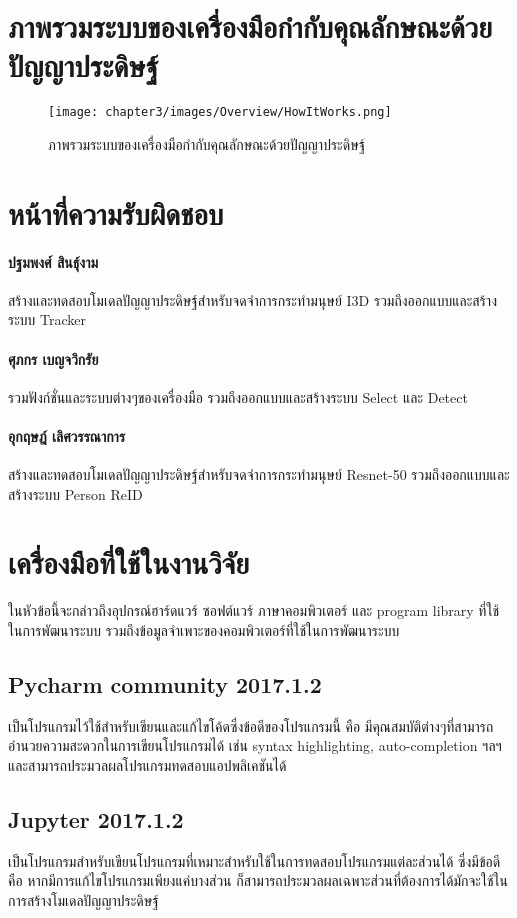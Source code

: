 \section{ภาพรวมระบบของเครื่องมือกำกับคุณลักษณะด้วยปัญญาประดิษฐ์}
\begin{figure}[!ht]
    \centering
    \texttt{[image: chapter3/images/Overview/HowItWorks.png]}
    \caption{ภาพรวมระบบของเครื่องมือกำกับคุณลักษณะด้วยปัญญาประดิษฐ์}
    \label{fig:labeling_overview}
\end{figure}
\clearpage

\section{หน้าที่ความรับผิดชอบ} 
\paragraph*{ปฐมพงศ์ สินธุ์งาม}
สร้างและทดสอบโมเดลปัญญาประดิษฐ์สำหรับจดจำการกระทำมนุษย์ I3D รวมถึงออกแบบและสร้างระบบ Tracker
\paragraph*{ศุภกร เบญจวิกรัย}
รวมฟังก์ชั่นและระบบต่างๆของเครื่องมือ รวมถึงออกแบบและสร้างระบบ Select และ Detect
\paragraph*{อุกฤษฎ์ เลิศวรรณาการ}
สร้างและทดสอบโมเดลปัญญาประดิษฐ์สำหรับจดจำการกระทำมนุษย์ Resnet-50 รวมถึงออกแบบและสร้างระบบ Person ReID 

\vspace{6mm}
\section{เครื่องมือที่ใช้ในงานวิจัย}
ในหัวข้อนี้จะกล่าวถึงอุปกรณ์ฮาร์ดแวร์ ซอฟต์แวร์ ภาษาคอมพิวเตอร์ และ program library ที่ใช้ในการพัฒนาระบบ รวมถึงข้อมูลจำเพาะของคอมพิวเตอร์ที่ใช้ในการพัฒนาระบบ
\subsection*{Pycharm community 2017.1.2} 
เป็นโปรแกรมไว้ใช้สำหรับเขียนและแก้ไขโค้ดซึ่งข้อดีของโปรแกรมนี้ คือ มีคุณสมบัติต่างๆที่สามารถอำนวยความสะดวกในการเขียนโปรแกรมได้ เช่น 
syntax highlighting, auto-completion ฯลฯ และสามารถประมวลผลโปรแกรมทดสอบแอปพลิเคชันได้

\subsection*{Jupyter 2017.1.2} เป็นโปรแกรมสำหรับเขียนโปรแกรมที่เหมาะสำหรับใช้ในการทดสอบโปรแกรมแต่ละส่วนได้ ซึ่งมีข้อดีคือ 
หากมีการแก้ไขโปรแกรมเพียงแค่บางส่วน ก็สามารถประมวลผลเฉพาะส่วนที่ต้องการได้มักจะใช้ในการสร้างโมเดลปัญญาประดิษฐ์

